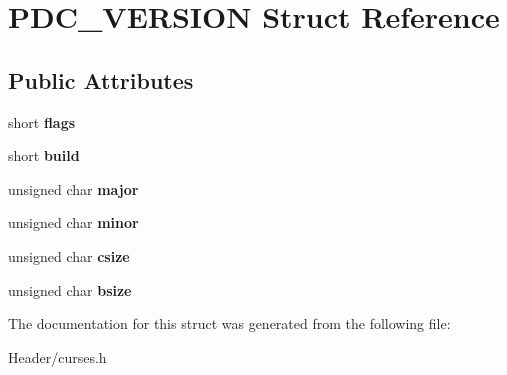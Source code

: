 \hypertarget{structPDC__VERSION}{}\section{P\+D\+C\+\_\+\+V\+E\+R\+S\+I\+ON Struct Reference}
\label{structPDC__VERSION}
\subsection*{Public Attributes}
\begin{DoxyCompactItemize}
\item 
\mbox{\label{structPDC__VERSION_ab78a4d1f0d9c3a1ce80ea1e847b5ff26}} 
short {\bfseries flags}
\item 
\mbox{\label{structPDC__VERSION_a3d934fdd044619e610029ded40634b75}} 
short {\bfseries build}
\item 
\mbox{\label{structPDC__VERSION_a2049dc77010c27e4bc682aef76bd8b75}} 
unsigned char {\bfseries major}
\item 
\mbox{\label{structPDC__VERSION_a1cbcda0c11545515763ea1744bb2e4b9}} 
unsigned char {\bfseries minor}
\item 
\mbox{\label{structPDC__VERSION_aee8f50ec6b6ead1618f3e59e30b25617}} 
unsigned char {\bfseries csize}
\item 
\mbox{\label{structPDC__VERSION_a760badd9facb3f009fda0d132652da23}} 
unsigned char {\bfseries bsize}
\end{DoxyCompactItemize}


The documentation for this struct was generated from the following file\+:\begin{DoxyCompactItemize}
\item 
Header/curses.\+h\end{DoxyCompactItemize}
